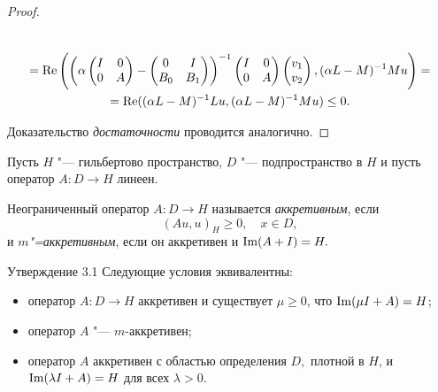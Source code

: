 \begin{proof}
\begin{itemize}
\begin{multline*}
\\
=\mathop{\rm Re}\left(\left(\alpha\begin{pmatrix} I &0\\0&A \end{pmatrix}-\begin{pmatrix} 0&I\\B_{0}&B_{1}\end{pmatrix}\right)^{-1}\begin{pmatrix} I&0\\0&A\end{pmatrix}\begin{pmatrix} v_{1}\\v_{2}\end{pmatrix},(\alpha L-M)^{-1}Mu\right)=
\\
=\mathop{\rm Re}((\alpha L-M)^{-1}Lu,(\alpha L-M)^{-1}Mu)\leq 0.
\end{multline*}


\end{itemize}

Доказательство  \emph{достаточности} проводится аналогично.
\end{proof}

\smallskip

 Пусть $H$ "--- гильбертово пространство, $D$ "--- подпространство в
$H$ и пусть оператор {$A:D\rightarrow H$} линеен.

\smallskip

\begin{definition}[3.1]Неограниченный оператор $A:D\rightarrow H$ называется \emph{аккретивным},  если
$$(Au,u)_{H}\geq 0, \quad  x\in D,$$ и \emph{$m$"=аккретивным}, если он аккретивен и $\mathop{\rm Im}(A+I)=H.$
\end{definition}

\smallskip

\begin{newthm}{Утверждение 3.1} Следующие условия эквивалентны\/{\rm :}
\begin{itemize}
\item[\rm (i)] оператор $A:D\rightarrow H$ аккретивен и существует
$\mu\geq 0${\rm ,} что $\mathop{\rm Im}(\mu I+A)=H$\/{\rm ;}
\item[\rm (ii)] оператор $A$ "--- $m$-аккретивен\/{\rm ;}
\item[\rm (iii)] оператор $A$ аккретивен с областью определения $D,$
плотной в $H${\rm ,} и $\mathop{\rm Im}(\lambda I+A)=H$ для всех $\lambda > 0.$
\end{itemize}
\end{newthm}

